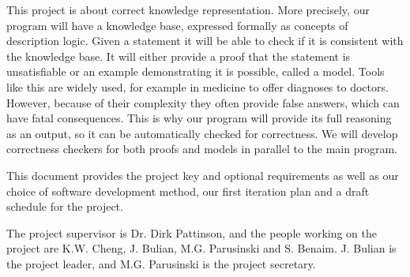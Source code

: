 This project is about correct knowledge representation. More precisely, our program will have a knowledge base, expressed formally as concepts of description logic. Given a statement it will be able to check if it is consistent with the knowledge base. It will either provide a proof that the statement is unsatisfiable or an example demonstrating it is possible, called a model. Tools like this are widely used, for example in medicine to offer diagnoses to doctors. However, because of their complexity they often provide false answers, which can have fatal consequences. This is why our program will provide its full reasoning as an output, so it can be automatically checked for correctness. We will develop correctness checkers for both proofs and models in parallel to the main program.

This document provides the project key and optional requirements as well as our choice of software development method, our first iteration plan and a draft schedule for the project.

The project supervisor is Dr. Dirk Pattinson, and the people working on the project
are K.W. Cheng, J. Bulian, M.G. Parusinski and S. Benaim. J. Bulian is the project leader, and M.G. Parusinski is the project secretary.

